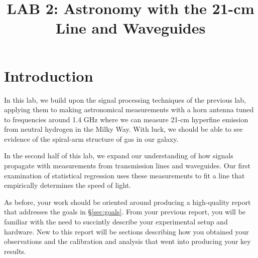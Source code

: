 \documentclass[11pt,preprint]{aastex}
\begin{document}
\def\simlt{\lower.5ex\hbox{$\; \buildrel < \over \sim \;$}}
\def\simgt{\lower.5ex\hbox{$\; \buildrel > \over \sim \;$}}

\title {LAB 2: Astronomy with the 21-cm Line and Waveguides}

\tableofcontents

\section{Introduction}

\noindent
In this lab, we build upon the signal processing techniques of the previous lab,
applying them to making astronomical measurements with a horn antenna
tuned to frequencies around 1.4 GHz where we can measure 21-cm hyperfine
emission from neutral hydrogen in the Milky Way.  With luck, we should be able
to see evidence of the spiral-arm structure of gas in our galaxy.

In the second half of this lab, we expand our understanding of how signals
propagate with measurements from transmission lines and waveguides. Our first examination
of statistical regression uses these measurements to fit a line that empirically
determines the speed of light.

As before, your work should be oriented around producing a high-quality report that
addresses the goals in \S\ref{sec:goals}. From your previous report, you will
be familiar with the need to succintly describe your experimental setup and hardware.
New to this report will be sections describing how you obtained your observations
and the calibration and analysis that went into producing your key results.
\end{document}
